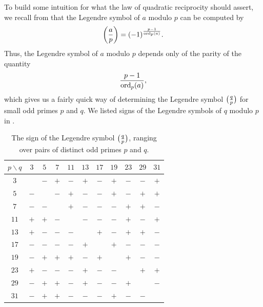 To build some intuition for what the law of quadratic reciprocity should assert, we recall from  that the Legendre symbol of $a$ modulo $p$ can be computed by
\begin{equation*}
  \legendre{a}{p}=(-1)^{\frac{p-1}{\ord_p(a)}}.
\end{equation*}
Thus, the Legendre symbol of $a$ modulo $p$ depends only of the parity of the quantity
\begin{equation*}
  \frac{p-1}{\operatorname{ord}_p(a)},
\end{equation*}
which gives us a fairly quick way of determining the Legendre symbol $\legendre{q}{p}$ for small odd primes $p$ and $q$. We listed signs of the Legendre symbols of $q$ modulo $p$ in .

\begin{table}[t]
  \begin{center}
    \begin{tabular}{c|cccccccccc}
      \toprule
      $p \backslash q$ & $3$ & $5$ & $7$ & $11$ & $13$ & $17$ & $19$ & $23$ & $29$ & $31$ \\
      \midrule
      $3$  &  & $-$ & $+$ & $-$ & $+$ & $-$ & $+$ & $-$ & $-$ & $+$ \\
      $5$  & $-$ &  & $-$ & $+$ & $-$ & $-$ & $+$ & $-$ & $+$ & $+$ \\
      $7$  & $-$ & $-$ &  & $+$ & $-$ & $-$ & $-$ & $+$ & $+$ & $-$ \\
      $11$ & $+$ & $+$ & $-$ &  & $-$ & $-$ & $-$ & $+$ & $-$ & $+$ \\
      $13$ & $+$ & $-$ & $-$ & $-$ &  & $+$ & $-$ & $+$ & $+$ & $-$ \\
      $17$ & $-$ & $-$ & $-$ & $-$ & $+$ &  & $+$ & $-$ & $-$ & $-$ \\
      $19$ & $-$ & $+$ & $+$ & $+$ & $-$ & $+$ &  & $+$ & $-$ & $-$ \\
      $23$ & $+$ & $-$ & $-$ & $-$ & $+$ & $-$ & $-$ &  & $+$ & $+$ \\
      $29$ & $-$ & $+$ & $+$ & $-$ & $+$ & $-$ & $-$ & $+$ &  & $-$ \\
      $31$ & $-$ & $+$ & $+$ & $-$ & $-$ & $-$ & $+$ & $-$ & $-$ &  \\
      \bottomrule
    \end{tabular}
    \caption[The sign of the Legendre symbol]{\label{table:legendre-symbols-distinct-odd-primes}The sign of the Legendre symbol $\legendre{q}{p}$, ranging over pairs of distinct odd primes $p$ and $q$.}
  \end{center}
\end{table}

